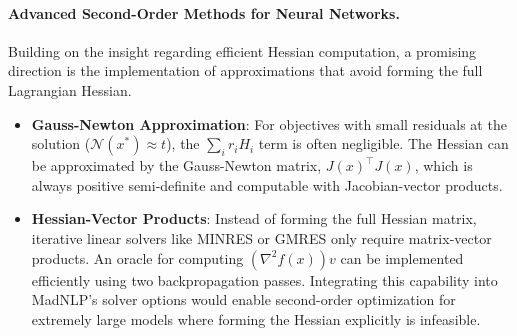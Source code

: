 \documentclass[11pt]{article}
\begin{document}
\paragraph{Advanced Second-Order Methods for Neural Networks.}
Building on the insight regarding efficient Hessian computation, a promising direction is the implementation of approximations that avoid forming the full Lagrangian Hessian.
\begin{itemize}[leftmargin=1.5em]
    \item \textbf{Gauss-Newton Approximation}: For objectives with small residuals at the solution ($\mathcal{N}(x^*) \approx t$), the $\sum_i r_i H_i$ term is often negligible. The Hessian can be approximated by the Gauss-Newton matrix, $J(x)^\top J(x)$, which is always positive semi-definite and computable with Jacobian-vector products.
    \item \textbf{Hessian-Vector Products}: Instead of forming the full Hessian matrix, iterative linear solvers like MINRES or GMRES only require matrix-vector products. An oracle for computing $(\nabla^2 f(x))v$ can be implemented efficiently using two backpropagation passes. Integrating this capability into MadNLP's solver options would enable second-order optimization for extremely large models where forming the Hessian explicitly is infeasible.
\end{itemize}
\end{document}
